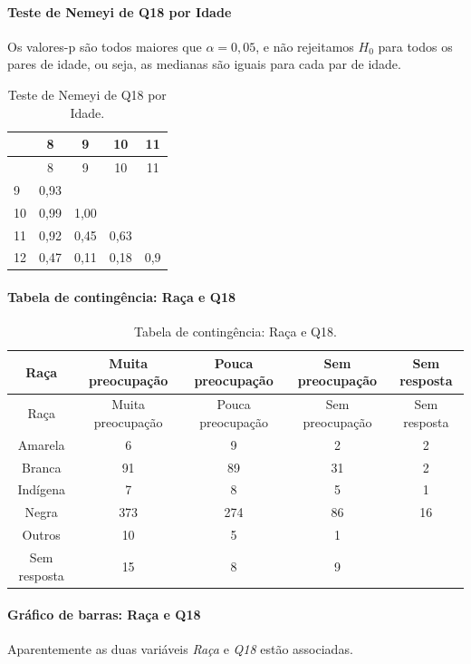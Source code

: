 \documentclass[]{article}
\let\oldparagraph\paragraph
\renewcommand{\paragraph}[1]{\oldparagraph{#1}\mbox{}}
\begin{document}
\hypertarget{teste-de-nemeyi-de-q18-por-idade}{%
\paragraph{Teste de Nemeyi de Q18 por Idade}\label{teste-de-nemeyi-de-q18-por-idade}}

Os valores-p são todos maiores que \(\alpha=0,05\), e não rejeitamos \(H_0\) para todos os pares de idade, ou seja, as medianas são iguais para cada par de idade.

\begin{longtable}[]{@{}lcccc@{}}
\caption{\label{tab:unnamed-chunk-239}Teste de Nemeyi de Q18 por Idade.}\tabularnewline
\toprule
& 8 & 9 & 10 & 11\tabularnewline
\midrule
\endfirsthead
\toprule
& 8 & 9 & 10 & 11\tabularnewline
\midrule
\endhead
9 & 0,93 & & &\tabularnewline
10 & 0,99 & 1,00 & &\tabularnewline
11 & 0,92 & 0,45 & 0,63 &\tabularnewline
12 & 0,47 & 0,11 & 0,18 & 0,9\tabularnewline
\bottomrule
\end{longtable}

\cleardoublepage

\hypertarget{tabela-de-continguxeancia-rauxe7a-e-q18}{%
\paragraph{Tabela de contingência: Raça e Q18}\label{tabela-de-continguxeancia-rauxe7a-e-q18}}

\begin{longtable}[]{@{}ccccc@{}}
\caption{\label{tab:unnamed-chunk-240}Tabela de contingência: Raça e Q18.}\tabularnewline
\toprule
Raça & Muita preocupação & Pouca preocupação & Sem preocupação & Sem resposta\tabularnewline
\midrule
\endfirsthead
\toprule
Raça & Muita preocupação & Pouca preocupação & Sem preocupação & Sem resposta\tabularnewline
\midrule
\endhead
Amarela & 6 & 9 & 2 & 2\tabularnewline
Branca & 91 & 89 & 31 & 2\tabularnewline
Indígena & 7 & 8 & 5 & 1\tabularnewline
Negra & 373 & 274 & 86 & 16\tabularnewline
Outros & 10 & 5 & 1 &\tabularnewline
Sem resposta & 15 & 8 & 9 &\tabularnewline
\bottomrule
\end{longtable}

\hypertarget{gruxe1fico-de-barras-rauxe7a-e-q18}{%
\paragraph{Gráfico de barras: Raça e Q18}\label{gruxe1fico-de-barras-rauxe7a-e-q18}}

Aparentemente as duas variáveis \emph{Raça} e \emph{Q18} estão associadas.
\end{document}
